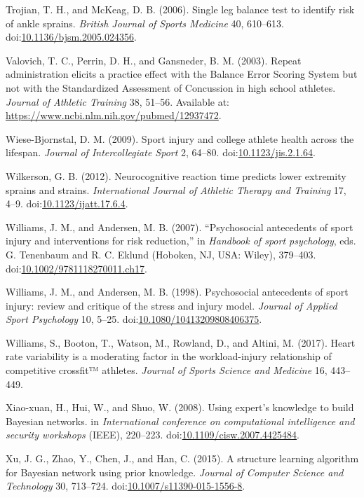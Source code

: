 \documentclass[
]{frontiersHLTH}
\newlength{\cslhangindent}
\newenvironment{cslreferences}%
  {\setlength{\parindent}{0pt}%
  \everypar{\setlength{\hangindent}{\cslhangindent}}\ignorespaces}%
  {\par}
\begin{document}
\begin{cslreferences}
\leavevmode\hypertarget{ref-Trojian2006}{}%
Trojian, T. H., and McKeag, D. B. (2006). Single leg balance test to
identify risk of ankle sprains. \emph{British Journal of Sports
Medicine} 40, 610--613.
doi:\href{https://doi.org/10.1136/bjsm.2005.024356}{10.1136/bjsm.2005.024356}.

\leavevmode\hypertarget{ref-Valovich2003}{}%
Valovich, T. C., Perrin, D. H., and Gansneder, B. M. (2003). Repeat
administration elicits a practice effect with the Balance Error Scoring
System but not with the Standardized Assessment of Concussion in high
school athletes. \emph{Journal of Athletic Training} 38, 51--56.
Available at: \url{https://www.ncbi.nlm.nih.gov/pubmed/12937472}.

\leavevmode\hypertarget{ref-Wiese-Bjornstal2009}{}%
Wiese-Bjornstal, D. M. (2009). Sport injury and college athlete health
across the lifespan. \emph{Journal of Intercollegiate Sport} 2, 64--80.
doi:\href{https://doi.org/10.1123/jis.2.1.64}{10.1123/jis.2.1.64}.

\leavevmode\hypertarget{ref-Wilkerson2012a}{}%
Wilkerson, G. B. (2012). Neurocognitive reaction time predicts lower
extremity sprains and strains. \emph{International Journal of Athletic
Therapy and Training} 17, 4--9.
doi:\href{https://doi.org/10.1123/ijatt.17.6.4}{10.1123/ijatt.17.6.4}.

\leavevmode\hypertarget{ref-Williams2007}{}%
Williams, J. M., and Andersen, M. B. (2007). ``Psychosocial antecedents
of sport injury and interventions for risk reduction,'' in
\emph{Handbook of sport psychology}, eds. G. Tenenbaum and R. C. Eklund
(Hoboken, NJ, USA: Wiley), 379--403.
doi:\href{https://doi.org/10.1002/9781118270011.ch17}{10.1002/9781118270011.ch17}.

\leavevmode\hypertarget{ref-Williams1998}{}%
Williams, J. M., and Andersen, M. B. (1998). Psychosocial antecedents of
sport injury: review and critique of the stress and injury model.
\emph{Journal of Applied Sport Psychology} 10, 5--25.
doi:\href{https://doi.org/10.1080/10413209808406375}{10.1080/10413209808406375}.

\leavevmode\hypertarget{ref-Williams2017}{}%
Williams, S., Booton, T., Watson, M., Rowland, D., and Altini, M.
(2017). Heart rate variability is a moderating factor in the
workload-injury relationship of competitive crossfit™ athletes.
\emph{Journal of Sports Science and Medicine} 16, 443--449.

\leavevmode\hypertarget{ref-Xiao-xuan2007}{}%
Xiao-xuan, H., Hui, W., and Shuo, W. (2008). Using expert's knowledge to
build Bayesian networks. in \emph{International conference on
computational intelligence and security workshops} (IEEE), 220--223.
doi:\href{https://doi.org/10.1109/cisw.2007.4425484}{10.1109/cisw.2007.4425484}.

\leavevmode\hypertarget{ref-Xu2015}{}%
Xu, J. G., Zhao, Y., Chen, J., and Han, C. (2015). A structure learning
algorithm for Bayesian network using prior knowledge. \emph{Journal of
Computer Science and Technology} 30, 713--724.
doi:\href{https://doi.org/10.1007/s11390-015-1556-8}{10.1007/s11390-015-1556-8}.
\end{cslreferences}
\end{document}
